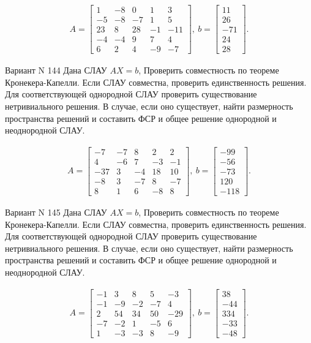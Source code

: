 \documentclass[11pt]{report}
\begin{document}
\begin{align*}
 A = \left[\begin{matrix}1 & -8 & 0 & 1 & 3\\-5 & -8 & -7 & 1 & 5\\23 & 8 & 28 & -1 & -11\\-4 & -4 & 9 & 7 & 4\\6 & 2 & 4 & -9 & -7\end{matrix}\right],
\ b = \left[\begin{matrix}11\\26\\-71\\24\\28\end{matrix}\right]. 
 \end{align*}

Вариант N 144
Дана СЛАУ $AX = b$,
Проверить совместность по теореме Кронекера-Капелли. Если СЛАУ совместна, проверить единственность решения.
Для соответствующей однородной СЛАУ проверить существование нетривиального решения. В случае, если оно существует,
найти размерность пространства решений и составить ФСР и общее решение однородной  и неоднородной СЛАУ.


\begin{align*}
 A = \left[\begin{matrix}-7 & -7 & 8 & 2 & 2\\4 & -6 & 7 & -3 & -1\\-37 & 3 & -4 & 18 & 10\\-8 & 3 & -7 & 8 & -7\\8 & 1 & 6 & -8 & 8\end{matrix}\right],
\ b = \left[\begin{matrix}-99\\-56\\-73\\120\\-118\end{matrix}\right]. 
 \end{align*}

Вариант N 145
Дана СЛАУ $AX = b$,
Проверить совместность по теореме Кронекера-Капелли. Если СЛАУ совместна, проверить единственность решения.
Для соответствующей однородной СЛАУ проверить существование нетривиального решения. В случае, если оно существует,
найти размерность пространства решений и составить ФСР и общее решение однородной  и неоднородной СЛАУ.


\begin{align*}
 A = \left[\begin{matrix}-1 & 3 & 8 & 5 & -3\\-1 & -9 & -2 & -7 & 4\\2 & 54 & 34 & 50 & -29\\-7 & -2 & 1 & -5 & 6\\1 & -3 & -3 & 8 & -9\end{matrix}\right],
\ b = \left[\begin{matrix}38\\-44\\334\\-33\\-48\end{matrix}\right]. 
 \end{align*}
\end{document}
